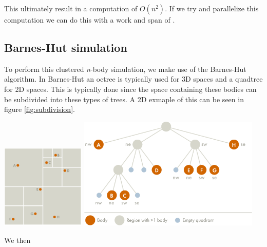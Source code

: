 This ultimately result in a computation of $O(n^2)$.
If we try and parallelize this computation we can do this with a work and span of .

\subsection{Barnes-Hut simulation}
To perform this clustered \textit{n}-body simulation, we make use of the
Barnes-Hut algorithm\cite{BH-algo}. In Barnes-Hut an octree is typically used for 3D
spaces and a quadtree for 2D spaces. This is typically done since the space
containing these bodies can be subdivided into these types of trees. A 2D
exmaple of this can be seen in figure \ref{fig:subdivision}.

\begin{Figure}
  \centering
  \includegraphics[width=0.30\textwidth]{assests/example-space}
  \includegraphics[width=0.65\textwidth]{assests/example-tree}
  \label{fig:subdivision}
\end{Figure}

We then
